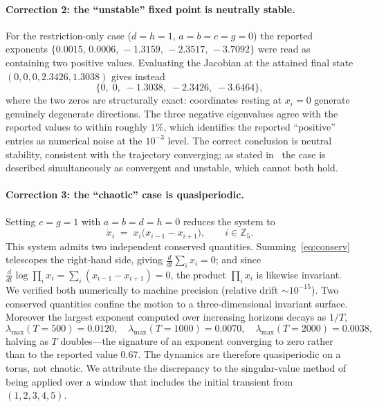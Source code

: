 \documentclass{article}
\begin{document}
\paragraph{Correction 2: the ``unstable'' fixed point is neutrally stable.}
For the restriction-only case ($d=h=1$, $a=b=c=g=0$) the reported exponents
$\{0.0015,\,0.0006,\,-1.3159,\,-2.3517,\,-3.7092\}$ were read as containing two
positive values. Evaluating the Jacobian at the attained final state
$(0,0,0,2.3426,1.3038)$ gives instead
\[
\{0,\;0,\;-1.3038,\;-2.3426,\;-3.6464\},
\]
where the two zeros are structurally exact: coordinates resting at $x_i=0$ generate
genuinely degenerate directions. The three negative eigenvalues agree with the
reported values to within roughly $1\%$, which identifies the reported ``positive''
entries as numerical noise at the $10^{-3}$ level. The correct conclusion is
neutral stability, consistent with the trajectory converging; as stated
in~\cite{Lin2020} the case is described simultaneously as convergent and unstable,
which cannot both hold.

\paragraph{Correction 3: the ``chaotic'' case is quasiperiodic.}
Setting $c=g=1$ with $a=b=d=h=0$ reduces the system to
\begin{equation}\label{eq:conserv}
\dot{x}_i \;=\; x_i\bigl(x_{i-1}-x_{i+1}\bigr), \qquad i\in\mathbb{Z}_5 .
\end{equation}
This system admits two independent conserved quantities. Summing~\eqref{eq:conserv}
telescopes the right-hand side, giving $\frac{d}{dt}\sum_i x_i=0$; and since
$\frac{d}{dt}\log\prod_i x_i=\sum_i(x_{i-1}-x_{i+1})=0$, the product $\prod_i x_i$
is likewise invariant. We verified both numerically to machine precision (relative
drift $\sim10^{-15}$). Two conserved quantities confine the motion to a
three-dimensional invariant surface. Moreover the largest exponent computed over
increasing horizons decays as $1/T$,
\[
\lambda_{\max}(T{=}500)=0.0120,\quad
\lambda_{\max}(T{=}1000)=0.0070,\quad
\lambda_{\max}(T{=}2000)=0.0038,
\]
halving as $T$ doubles---the signature of an exponent converging to zero rather
than to the reported value $0.67$. The dynamics are therefore quasiperiodic on a
torus, not chaotic. We attribute the discrepancy to the singular-value method
of~\cite{Lin2020} being applied over a window that includes the initial transient
from $(1,2,3,4,5)$.
\end{document}
